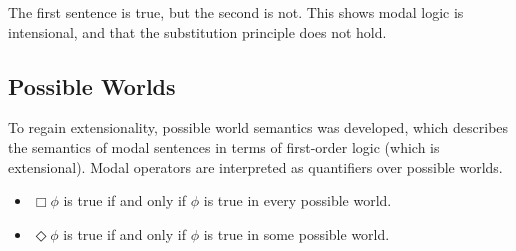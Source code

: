 \documentclass{llncs}
\begin{document}
\noindent
The first sentence is true, but the second is not. This shows modal logic is intensional, and that the substitution principle does not hold.

\subsection{Possible Worlds}

To regain extensionality, possible world semantics was developed, which describes the semantics of modal sentences in terms of first-order logic (which is extensional). Modal operators are interpreted as quantifiers over possible worlds.

\begin{itemize}
	\item $\Box \phi$ is true if and only if $\phi$ is true in every possible world.
	\item $\Diamond \phi$ is true if and only if $\phi$ is true in some possible world.
\end{itemize}
\end{document}
